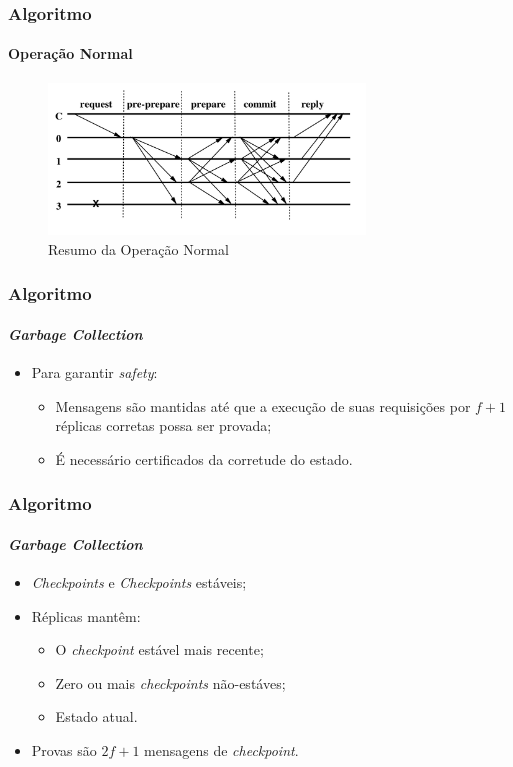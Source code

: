 \documentclass{beamer}
\begin{document}
\begin{frame}
  \frametitle{Algoritmo}
  \framesubtitle{Operação Normal}

  \begin{figure}
    \includegraphics[width=0.75\textwidth]{images/normal-case-op}
    \caption{Resumo da Operação Normal}
  \end{figure}
\end{frame}

\begin{frame}
  \frametitle{Algoritmo}
  \framesubtitle{\textit{Garbage Collection}}

  \begin{itemize}
    \item
      Para garantir \textit{safety}:
      \begin{itemize}
        \item
          Mensagens são mantidas até que a execução de suas requisições por $f + 1$ réplicas corretas possa ser provada;

        \item
          É necessário certificados da corretude do estado.
      \end{itemize}
  \end{itemize}
\end{frame}

\begin{frame}
  \frametitle{Algoritmo}
  \framesubtitle{\textit{Garbage Collection}}

  \begin{itemize}
    \item
      \textit{Checkpoints} e \textit{Checkpoints} estáveis;

    \item
      Réplicas mantêm:
      \begin{itemize}
        \item
          O \textit{checkpoint} estável mais recente;

        \item
          Zero ou mais \textit{checkpoints} não-estáves;

        \item
          Estado atual.
      \end{itemize}

    \item
      Provas são $2f + 1$ mensagens de \textit{checkpoint}.
  \end{itemize}
\end{frame}
\end{document}

